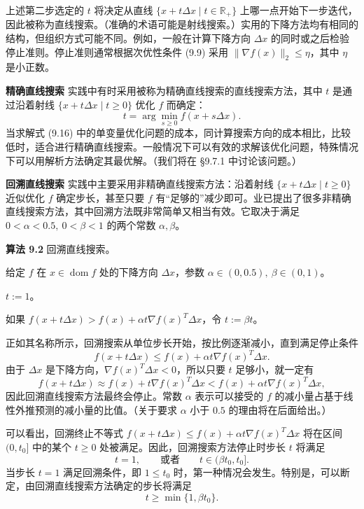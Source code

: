 \documentclass[UTF8, 12pt, fontset=fandol, oneside]{ctexart}
\begin{document}
上述第二步选定的 $t$ 将决定从直线 $\{x+t\Delta x\mid t\in\mathbb{R}_+\}$ 上哪一点开始下一步迭代，因此被称为直线搜索。（准确的术语可能是射线搜索。）实用的下降方法均有相同的结构，但组织方式可能不同。例如，一般在计算下降方向 $\Delta x$ 的同时或之后检验停止准则。停止准则通常根据次优性条件 (9.9) 采用 $\|\nabla f(x)\|_2\leq\eta$，其中 $\eta$ 是小正数。

\noindent\textbf{精确直线搜索}\quad
实践中有时采用被称为精确直线搜索的直线搜索方法，其中 $t$ 是通过沿着射线 $\{x+t\Delta x\mid t\geq0\}$ 优化 $f$ 而确定：
\begin{equation}
t=\arg\min_{s\geq0} f(x+s\Delta x).
\tag{9.16}
\end{equation}
当求解式 (9.16) 中的单变量优化问题的成本，同计算搜索方向的成本相比，比较低时，适合进行精确直线搜索。一般情况下可以有效的求解该优化问题，特殊情况下可以用解析方法确定其最优解。（我们将在 \S9.7.1 中讨论该问题。）

\noindent\textbf{回溯直线搜索}\quad
实践中主要采用非精确直线搜索方法：沿着射线 $\{x+t\Delta x\mid t\geq0\}$ 近似优化 $f$ 确定步长，甚至只要 $f$ 有“足够的”减少即可。业已提出了很多非精确直线搜索方法，其中回溯方法既非常简单又相当有效。它取决于满足 $0<\alpha<0.5,\ 0<\beta<1$ 的两个常数 $\alpha,\beta$。

\noindent\textbf{算法 9.2}\quad
回溯直线搜索。

给定 $f$ 在 $x\in\operatorname{dom} f$ 处的下降方向 $\Delta x$，参数 $\alpha\in(0,0.5),\ \beta\in(0,1)$。

$t:=1$。

如果 $f(x+t\Delta x)>f(x)+\alpha t\nabla f(x)^T\Delta x$，令 $t:=\beta t$。

正如其名称所示，回溯搜索从单位步长开始，按比例逐渐减小，直到满足停止条件
\[
f(x+t\Delta x)\leq f(x)+\alpha t\nabla f(x)^T\Delta x.
\]
由于 $\Delta x$ 是下降方向，$\nabla f(x)^T\Delta x<0$，所以只要 $t$ 足够小，就一定有
\[
f(x+t\Delta x)\approx f(x)+t\nabla f(x)^T\Delta x<f(x)+\alpha t\nabla f(x)^T\Delta x,
\]
因此回溯直线搜索方法最终会停止。常数 $\alpha$ 表示可以接受的 $f$ 的减小量占基于线性外推预测的减小量的比值。（关于要求 $\alpha$ 小于 $0.5$ 的理由将在后面给出。）

可以看出，回溯终止不等式 $f(x+t\Delta x)\leq f(x)+\alpha t\nabla f(x)^T\Delta x$ 将在区间 $(0,t_0]$ 中的某个 $t\geq0$ 处被满足。因此，回溯搜索方法停止时步长 $t$ 将满足
\[
t=1,\qquad \text{或者}\qquad t\in(\beta t_0,t_0].
\]
当步长 $t=1$ 满足回溯条件，即 $1\leq t_0$ 时，第一种情况会发生。特别是，可以断定，由回溯直线搜索方法确定的步长将满足
\[
t\geq\min\{1,\beta t_0\}.
\]
\end{document}
